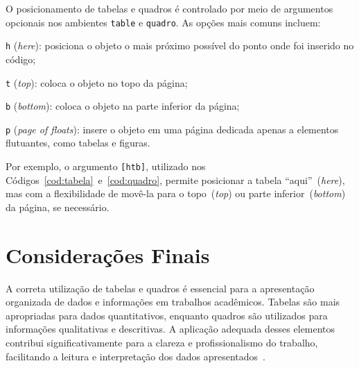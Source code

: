\documentclass[
    12pt
    ,oneside
    ,a4paper
    ,chapter=TITLE
    ,section=TITLE
    ,sumario=abnt-6027-2012]{abntex2}
\begin{document}
O posicionamento de tabelas e quadros é controlado por meio de argumentos opcionais nos ambientes \texttt{table} e \texttt{quadro}. As opções mais comuns incluem:

\begin{alineas}
    \item \texttt{h} (\textit{here}): posiciona o objeto o mais próximo possível do ponto onde foi inserido no código;
    \item \texttt{t} (\textit{top}): coloca o objeto no topo da página;
    \item \texttt{b} (\textit{bottom}): coloca o objeto na parte inferior da página;
    \item \texttt{p} (\textit{page of floats}): insere o objeto em uma página dedicada apenas a elementos flutuantes, como tabelas e figuras.
\end{alineas}

Por exemplo, o argumento \texttt{[htb]}, utilizado nos Códigos~\ref{cod:tabela}~e~\ref{cod:quadro}, permite posicionar a tabela ``aqui''~(\textit{here}), mas com a flexibilidade de movê-la para o topo~(\textit{top}) ou parte inferior~(\textit{bottom}) da página, se necessário.

\section{Considerações Finais}

A correta utilização de tabelas e quadros é essencial para a apresentação organizada de dados e informações em trabalhos acadêmicos. Tabelas são mais apropriadas para dados quantitativos, enquanto quadros são utilizados para informações qualitativas e descritivas. A aplicação adequada desses elementos contribui significativamente para a clareza e profissionalismo do trabalho, facilitando a leitura e interpretação dos dados apresentados~\cite{knuth1984texbook}.





\end{document}
